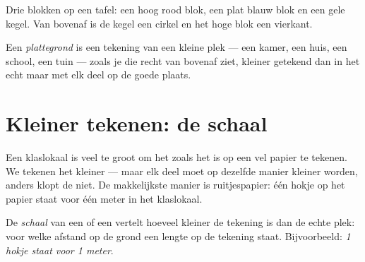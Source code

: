 \begin{omfigure}

{\small Drie blokken op een tafel: een hoog rood blok, een plat blauw blok
en een gele kegel. Van bovenaf is de kegel een cirkel en het hoge blok een
vierkant.}
\label{fig:g2:drawing-to-map:blocks}
\end{omfigure}

\begin{definition}[Plattegrond]\label{def:g2:drawing-to-map:plan}
Een \emph{plattegrond} is een tekening van een kleine
plek --- een kamer, een huis, een school, een tuin --- zoals je die recht
van bovenaf ziet, kleiner getekend dan in het echt maar met elk deel op de
goede plaats.
\end{definition}

\section{Kleiner tekenen: de schaal}

Een klaslokaal is veel te groot om het zoals het is op een vel papier te
tekenen. We tekenen het kleiner --- maar elk deel moet op dezelfde manier
kleiner worden, anders klopt de  niet. De makkelijkste manier is
ruitjespapier: één hokje op het papier staat voor één meter in het
klaslokaal.

\begin{definition}[Schaal]\label{def:g2:drawing-to-map:scale}
De \emph{schaal} van een  of een  vertelt
hoeveel kleiner de tekening is dan de echte plek: voor welke afstand op de
grond een lengte op de tekening staat. Bijvoorbeeld: \emph{1 hokje staat
voor 1 meter}.
\end{definition}

